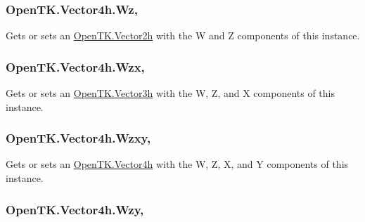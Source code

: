 \hypertarget{struct_open_t_k_1_1_vector4h_a806035c5cd250ddabef878a7e534f744}{
\subsubsection[{Wz}]{ Open\-T\-K.\-Vector4h.\-Wz\hspace{0.3cm}{\ttfamily [get]}, {\ttfamily [set]}}}\label{struct_open_t_k_1_1_vector4h_a806035c5cd250ddabef878a7e534f744}


Gets or sets an \hyperlink{struct_open_t_k_1_1_vector2h}{Open\-T\-K.\-Vector2h} with the W and Z components of this instance. 

\hypertarget{struct_open_t_k_1_1_vector4h_a7474b28d9ac6ea7e866e683379a7950b}{
\subsubsection[{Wzx}]{ Open\-T\-K.\-Vector4h.\-Wzx\hspace{0.3cm}{\ttfamily [get]}, {\ttfamily [set]}}}\label{struct_open_t_k_1_1_vector4h_a7474b28d9ac6ea7e866e683379a7950b}


Gets or sets an \hyperlink{struct_open_t_k_1_1_vector3h}{Open\-T\-K.\-Vector3h} with the W, Z, and X components of this instance. 

\hypertarget{struct_open_t_k_1_1_vector4h_a8472c7913c7dc5898156ffa729b7cf49}{
\subsubsection[{Wzxy}]{ Open\-T\-K.\-Vector4h.\-Wzxy\hspace{0.3cm}{\ttfamily [get]}, {\ttfamily [set]}}}\label{struct_open_t_k_1_1_vector4h_a8472c7913c7dc5898156ffa729b7cf49}


Gets or sets an \hyperlink{struct_open_t_k_1_1_vector4h}{Open\-T\-K.\-Vector4h} with the W, Z, X, and Y components of this instance. 

\hypertarget{struct_open_t_k_1_1_vector4h_a8ac48437afbd0cdda817f67ae58a9428}{
\subsubsection[{Wzy}]{ Open\-T\-K.\-Vector4h.\-Wzy\hspace{0.3cm}{\ttfamily [get]}, {\ttfamily [set]}}}\label{struct_open_t_k_1_1_vector4h_a8ac48437afbd0cdda817f67ae58a9428}


